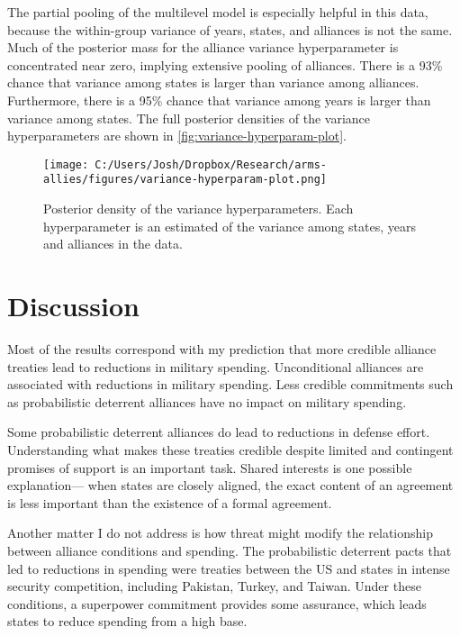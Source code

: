 \documentclass[12pt]{article}
\begin{document}
The partial pooling of the multilevel model is especially helpful in this data, because the within-group variance of years, states, and alliances is not the same. Much of the posterior mass for the alliance variance hyperparameter is concentrated near zero, implying extensive pooling of alliances. There is a 93\% chance that variance among states is larger than variance among alliances. Furthermore, there is a 95\% chance that variance among years is larger than variance among states. The full posterior densities of the variance hyperparameters are shown in \autoref{fig:variance-hyperparam-plot}. 

\begin{figure}[htbp]
	\centering
		\texttt{[image: C:/Users/Josh/Dropbox/Research/arms-allies/figures/variance-hyperparam-plot.png]}
	\caption{Posterior density of the variance hyperparameters. Each hyperparameter is an estimated of the variance among states, years and alliances in the data.}
	\label{fig:variance-hyperparam-plot}
\end{figure}


\section*{Discussion} 

Most of the results correspond with my prediction that more credible alliance treaties lead to reductions in military spending. Unconditional alliances are associated with reductions in military spending. Less credible commitments such as probabilistic deterrent alliances have no impact on military spending. 

Some probabilistic deterrent alliances do lead to reductions in defense effort. Understanding what makes these treaties credible despite limited and contingent promises of support is an important task. Shared interests is one possible explanation--- when states are closely aligned, the exact content of an agreement is less important than the existence of a formal agreement. 

Another matter I do not address is how threat might modify the relationship between alliance conditions and spending. The probabilistic deterrent pacts that led to reductions in spending were treaties between the US and states in intense security competition, including Pakistan, Turkey, and Taiwan. Under these conditions, a superpower commitment provides some assurance, which leads states to reduce spending from a high base. 
\end{document}

